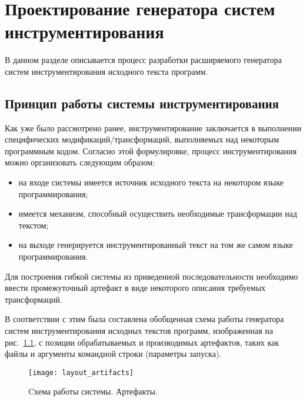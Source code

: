 \chapter{Проектирование генератора систем инструментирования}

В данном разделе описывается процесс разработки расширяемого генератора систем инструментирования исходного текста программ.

\section{Принцип работы системы инструментирования}

Как уже было рассмотрено ранее, инструментирование заключается в выполнении специфических модификаций/трансформаций, выполняемых над некоторым программным кодом.
Согласно этой формулировке, процесс инструментирования можно организовать следующим образом:
\begin{itemize}[noitemsep]
  \item на входе системы имеется источник исходного текста на некотором языке программирования;
  \item имеется механизм, способный осуществить необходимые трансформации над текстом;
  \item на выходе генерируется инструментированный текст на том же самом языке программирования.
\end{itemize}

Для построения гибкой системы из приведенной последовательности необходимо ввести промежуточный артефакт в виде некоторого описания требуемых трансформаций.

В соответствии с этим была составлена обобщенная схема работы генератора систем инструментирования исходных текстов программ, изображенная на рис.~\ref{fig:layout_artifacts}, с позиции обрабатываемых и производимых артефактов, таких как файлы и аргументы командной строки (параметры запуска).

\begin{figure}[!h]
	\centering
	\texttt{[image: layout\_artifacts]}
	\caption{Cхема работы системы. Артефакты.}
	\label{fig:layout_artifacts}
\end{figure}


